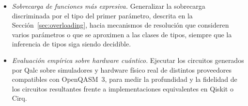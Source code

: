 \begin{itemize}
  \item \textit{Sobrecarga de funciones más expresiva.} Generalizar la sobrecarga discriminada por el tipo del primer parámetro, descrita en la Sección~\ref{sec:overloading}, hacia mecanismos de resolución que consideren varios parámetros o que se aproximen a las clases de tipos, siempre que la inferencia de tipos siga siendo decidible.

  \item \textit{Evaluación empírica sobre hardware cuántico.} Ejecutar los circuitos generados por Qalc sobre simuladores y hardware físico real de distintos proveedores compatibles con OpenQASM~3, para medir la profundidad y la fidelidad de los circuitos resultantes frente a implementaciones equivalentes en Qiskit o Cirq.
\end{itemize}
